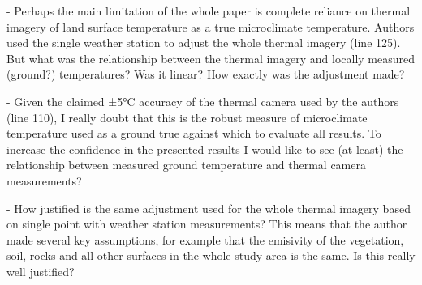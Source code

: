 \documentclass[12pt,english]{reviewresponse}
\begin{document}
\begin{revcomment}
- Perhaps the main limitation of the whole paper is complete reliance on thermal imagery of land surface temperature as a true microclimate temperature. Authors used the single weather station to adjust the whole thermal imagery (line 125). But what was the relationship between the thermal imagery and locally measured (ground?) temperatures? Was it linear? How exactly was the adjustment made?

- Given the claimed ±5°C accuracy of the thermal camera used by the authors (line 110), I really doubt that this is the robust measure of microclimate temperature used as a ground true against which to evaluate all results. To increase the confidence in the presented results I would like to see (at least) the relationship between measured ground temperature and thermal camera measurements?

- How justified is the same adjustment used for the whole thermal imagery based on single point with weather station measurements? This means that the author made several key assumptions, for example that the emisivity of the vegetation, soil, rocks and all other surfaces in the whole study area is the same. Is this really well justified?
\end{revcomment}
\end{document}
